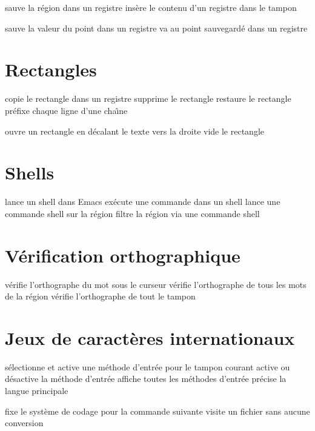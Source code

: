  sauve la r\'egion dans un registre
 ins\`ere le contenu d'un registre dans le tampon

 sauve la valeur du point dans un registre
 va au point sauvegard\'e dans un registre

\section{Rectangles}

 copie le rectangle dans un registre
 supprime le rectangle
 restaure le rectangle
 pr\'efixe chaque ligne d'une cha\^\i{}ne

 ouvre un rectangle en d\'ecalant le texte vers la droite
 vide le rectangle

\section{Shells}

 lance un shell dans Emacs
 ex\'ecute une commande dans un shell
 lance une commande shell sur la r\'egion
 filtre la r\'egion via une commande shell

\section{V\'erification orthographique}

 v\'erifie l'orthographe du mot sous le curseur
 v\'erifie l'orthographe de tous les mots de la r\'egion
 v\'erifie l'orthographe de tout le tampon

\section{Jeux de caract\`eres internationaux}

 s\'electionne et active une m\'ethode d'entr\'ee pour le
  tampon courant
 active ou d\'esactive la m\'ethode d'entr\'ee
 affiche toutes les m\'ethodes d'entr\'ee
 pr\'ecise la langue principale

 fixe le syst\`eme de codage pour la commande suivante
 visite un fichier sans aucune conversion

